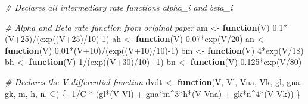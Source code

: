 \documentclass[
]{article}
\newenvironment{Shaded}{\begin{snugshade}}{\end{snugshade}}
\newcommand{\CommentTok}[1]{\textcolor[rgb]{0.56,0.35,0.01}{\textit{#1}}}
\newcommand{\ControlFlowTok}[1]{\textcolor[rgb]{0.13,0.29,0.53}{\textbf{#1}}}
\newcommand{\DecValTok}[1]{\textcolor[rgb]{0.00,0.00,0.81}{#1}}
\newcommand{\FloatTok}[1]{\textcolor[rgb]{0.00,0.00,0.81}{#1}}
\newcommand{\FunctionTok}[1]{\textcolor[rgb]{0.00,0.00,0.00}{#1}}
\newcommand{\NormalTok}[1]{#1}
\newcommand{\OtherTok}[1]{\textcolor[rgb]{0.56,0.35,0.01}{#1}}
\newcommand{\SpecialCharTok}[1]{\textcolor[rgb]{0.00,0.00,0.00}{#1}}
\begin{document}
\begin{Shaded}
\begin{Highlighting}[]
\CommentTok{\# Declares all intermediary rate functions alpha\_i and beta\_i}

\CommentTok{\# Alpha and Beta rate function from original paper}
\NormalTok{am }\OtherTok{\textless{}{-}} \ControlFlowTok{function}\NormalTok{(V) }\FloatTok{0.1}\SpecialCharTok{*}\NormalTok{(V}\SpecialCharTok{+}\DecValTok{25}\NormalTok{)}\SpecialCharTok{/}\NormalTok{(}\FunctionTok{exp}\NormalTok{((V}\SpecialCharTok{+}\DecValTok{25}\NormalTok{)}\SpecialCharTok{/}\DecValTok{10}\NormalTok{)}\SpecialCharTok{{-}}\DecValTok{1}\NormalTok{)}
\NormalTok{ah }\OtherTok{\textless{}{-}} \ControlFlowTok{function}\NormalTok{(V) }\FloatTok{0.07}\SpecialCharTok{*}\FunctionTok{exp}\NormalTok{(V}\SpecialCharTok{/}\DecValTok{20}\NormalTok{)}
\NormalTok{an }\OtherTok{\textless{}{-}} \ControlFlowTok{function}\NormalTok{(V) }\FloatTok{0.01}\SpecialCharTok{*}\NormalTok{(V}\SpecialCharTok{+}\DecValTok{10}\NormalTok{)}\SpecialCharTok{/}\NormalTok{(}\FunctionTok{exp}\NormalTok{((V}\SpecialCharTok{+}\DecValTok{10}\NormalTok{)}\SpecialCharTok{/}\DecValTok{10}\NormalTok{)}\SpecialCharTok{{-}}\DecValTok{1}\NormalTok{)}
\NormalTok{bm }\OtherTok{\textless{}{-}} \ControlFlowTok{function}\NormalTok{(V) }\DecValTok{4}\SpecialCharTok{*}\FunctionTok{exp}\NormalTok{(V}\SpecialCharTok{/}\DecValTok{18}\NormalTok{)}
\NormalTok{bh }\OtherTok{\textless{}{-}} \ControlFlowTok{function}\NormalTok{(V) }\DecValTok{1}\SpecialCharTok{/}\NormalTok{(}\FunctionTok{exp}\NormalTok{((V}\SpecialCharTok{+}\DecValTok{30}\NormalTok{)}\SpecialCharTok{/}\DecValTok{10}\NormalTok{)}\SpecialCharTok{+}\DecValTok{1}\NormalTok{)}
\NormalTok{bn }\OtherTok{\textless{}{-}} \ControlFlowTok{function}\NormalTok{(V) }\FloatTok{0.125}\SpecialCharTok{*}\FunctionTok{exp}\NormalTok{(V}\SpecialCharTok{/}\DecValTok{80}\NormalTok{)}

\CommentTok{\# Declares the V{-}differential function}
\NormalTok{dvdt }\OtherTok{\textless{}{-}} \ControlFlowTok{function}\NormalTok{(V, Vl, Vna, Vk, gl, gna, gk, m, h, n, C) \{}
  \SpecialCharTok{{-}}\DecValTok{1}\SpecialCharTok{/}\NormalTok{C }\SpecialCharTok{*}\NormalTok{ (gl}\SpecialCharTok{*}\NormalTok{(V}\SpecialCharTok{{-}}\NormalTok{Vl) }\SpecialCharTok{+}\NormalTok{ gna}\SpecialCharTok{*}\NormalTok{m}\SpecialCharTok{\^{}}\DecValTok{3}\SpecialCharTok{*}\NormalTok{h}\SpecialCharTok{*}\NormalTok{(V}\SpecialCharTok{{-}}\NormalTok{Vna) }\SpecialCharTok{+}\NormalTok{ gk}\SpecialCharTok{*}\NormalTok{n}\SpecialCharTok{\^{}}\DecValTok{4}\SpecialCharTok{*}\NormalTok{(V}\SpecialCharTok{{-}}\NormalTok{Vk))}
\NormalTok{\}}


\end{Highlighting}
\end{Shaded}
\end{document}
